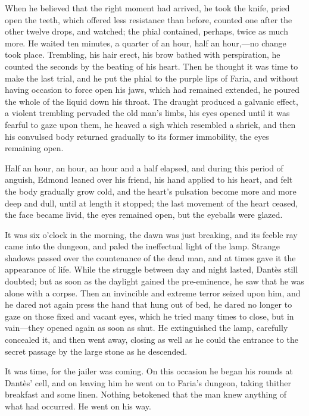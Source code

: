  When he believed that the right moment had arrived, he took the knife, pried open the teeth, which offered less resistance than before, counted one after the other twelve drops, and watched; the phial contained, perhaps, twice as much more. He waited ten minutes, a quarter of an hour, half an hour,—no change took place. Trembling, his hair erect, his brow bathed with perspiration, he counted the seconds by the beating of his heart. Then he thought it was time to make the last trial, and he put the phial to the purple lips of Faria, and without having occasion to force open his jaws, which had remained extended, he poured the whole of the liquid down his throat.  The draught produced a galvanic effect, a violent trembling pervaded the old man's limbs, his eyes opened until it was fearful to gaze upon them, he heaved a sigh which resembled a shriek, and then his convulsed body returned gradually to its former immobility, the eyes remaining open. 

 Half an hour, an hour, an hour and a half elapsed, and during this period of anguish, Edmond leaned over his friend, his hand applied to his heart, and felt the body gradually grow cold, and the heart's pulsation become more and more deep and dull, until at length it stopped; the last movement of the heart ceased, the face became livid, the eyes remained open, but the eyeballs were glazed. 

 It was six o'clock in the morning, the dawn was just breaking, and its feeble ray came into the dungeon, and paled the ineffectual light of the lamp. Strange shadows passed over the countenance of the dead man, and at times gave it the appearance of life. While the struggle between day and night lasted, Dantès still doubted; but as soon as the daylight gained the pre-eminence, he saw that he was alone with a corpse. Then an invincible and extreme terror seized upon him, and he dared not again press the hand that hung out of bed, he dared no longer to gaze on those fixed and vacant eyes, which he tried many times to close, but in vain—they opened again as soon as shut. He extinguished the lamp, carefully concealed it, and then went away, closing as well as he could the entrance to the secret passage by the large stone as he descended. 

 It was time, for the jailer was coming. On this occasion he began his rounds at Dantès' cell, and on leaving him he went on to Faria's dungeon, taking thither breakfast and some linen. Nothing betokened that the man knew anything of what had occurred. He went on his way. 

